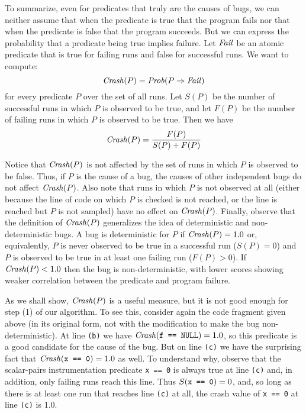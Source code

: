 To summarize, even for predicates that truly are the causes of bugs, we can neither assume that
when the predicate is true that
the program fails nor that when the predicate is false that
the program succeeds. But we can express the probability that a predicate
being true implies failure.  Let $\mbox{\textit{Fail}}$ be an atomic predicate that is
true for failing runs and false for successful runs.  We want to compute:
\[ \mbox{\textit{Crash}}(P) = \mbox{\textit{Prob}}(P \Rightarrow \mbox{\textit{Fail}}) \]
for every predicate $P$ over the set of all runs.  Let $S(P)$ be the number
of successful runs in which $P$ is observed to be true, and let $F(P)$ be the number of
failing runs in which $P$ is observed to be true.  Then we have
\[ \mbox{\textit{Crash}}(P) = \frac{F(P)}{S(P) + F(P)} \]


Notice that $\mbox{\textit{Crash}}(P)$ is not affected by the set of runs in which
$P$ is observed to be false.  Thus, if $P$ is the cause of a bug, the
causes of other independent bugs do not affect $\mbox{\textit{Crash}}(P)$.
Also note that runs in which $P$ is not observed at all (either because
the line of code on which $P$ is checked is not reached, or the line is reached
but $P$ is not sampled) have no effect on $\mbox{\textit{Crash}}(P)$.
Finally, observe that the definition of $\mbox{\textit{Crash}}(P)$
generalizes the idea of deterministic and non-deterministic bugs.  A
bug is deterministic for $P$ if $\mbox{\textit{Crash}}(P) = 1.0$ or, equivalently,
$P$ is never observed to be true in a successful run ($S(P) =
0$) and $P$ is observed to be true in at least one failing run ($F(P) > 0$).
If $\mbox{\textit{Crash}}(P) < 1.0$ then the bug is non-deterministic, with
lower scores showing weaker correlation between the predicate and
program failure.

As we shall show, $\mbox{\textit{Crash}}(P)$ is a useful measure, but it is not good
enough for step (1) of our algorithm. To see this, consider again the
code fragment given above (in its original form, not with the
modification to make the bug non-deterministic).  At line {\tt (b)} we
have $\mbox{\textit{Crash}}(\mbox{\tt f == NULL}) = 1.0$, so this predicate is a good
candidate for the cause of the bug.
But on line {\tt (c)} we have the surprising fact that $\mbox{\textit{Crash}}(\mbox{\tt x == 0}) = 1.0$ as well.
To understand why, observe that the scalar-pairs instrumentation
predicate \texttt{x == 0} is always true at line {\tt (c)} and, in
addition,
only failing runs reach this line.
Thus $S(\mbox{\tt x == 0}) = 0$, and, so long as there is at least one run that
reaches line {\tt (c)} at all, the crash value of {\tt x == 0} at line {\tt (c)} is 1.0.

